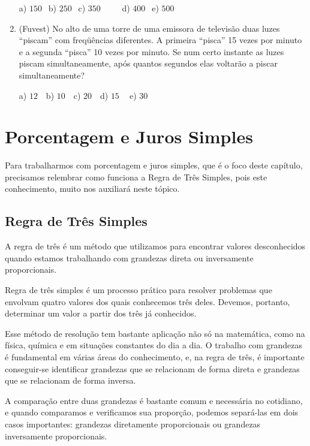 \begin{multicols*}{2}
\begin{enumerate}
	a) $150 \ \ $ b) $250 \ \ $ c) $350 \ \ \ \ \ \ \ \ \ \ $ d) $400 \ \ $ e) $500 \ \ $		
	
\item (Fuvest) No alto de uma torre de uma emissora de televisão duas luzes “piscam” com freqüências diferentes. A primeira “pisca” 15 vezes por minuto e a segunda “pisca” 10 vezes por minuto. Se num certo instante as luzes piscam simultaneamente, após quantos segundos elas voltarão a piscar simultaneamente? 
	
	a) $12 \ \ \ $ b) $10 \ \ \ $ c) $20 \ \ \ $ d) $15 \ \ \ \ $ e) $30 \ \ $

\end{enumerate}

	\section{Porcentagem e Juros Simples}
	
	Para trabalharmos com porcentagem e juros simples, que é o foco deste capítulo, precisamos relembrar como funciona a Regra de Três Simples, pois este conhecimento, muito nos auxiliará neste tópico.
	
	\subsection{Regra de Três Simples}
	
	A regra de três é um método que utilizamos para encontrar valores desconhecidos quando estamos trabalhando com grandezas direta ou inversamente proporcionais.
   
	Regra de três simples é um processo prático para resolver problemas que envolvam quatro valores dos quais conhecemos três deles. Devemos, portanto, determinar um valor a partir dos três já conhecidos.
		   
   Esse método de resolução tem bastante aplicação não só na matemática, como na física, química e em situações constantes do dia a dia. O trabalho com grandezas é fundamental em várias áreas do conhecimento, e, na regra de três, é importante conseguir-se identificar grandezas que se relacionam de forma direta e grandezas que se relacionam de forma inversa.
   
   A comparação entre duas grandezas é bastante comum e necessária no cotidiano, e quando comparamos e verificamos sua proporção, podemos separá-las em dois casos importantes: grandezas diretamente proporcionais ou grandezas inversamente proporcionais.


\end{multicols*}
